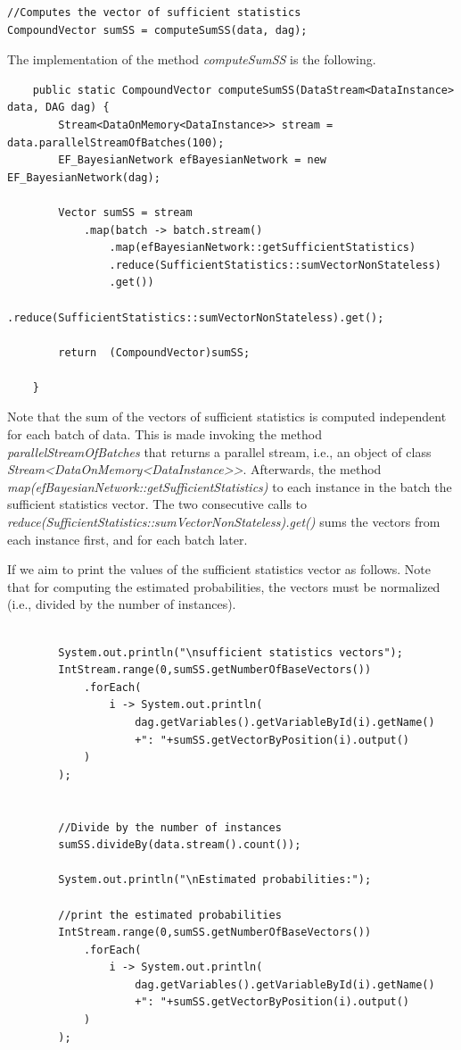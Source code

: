 \documentclass[10pt,a4paper]{article}
\begin{document}
\begin{lstlisting}
//Computes the vector of sufficient statistics
CompoundVector sumSS = computeSumSS(data, dag);
\end{lstlisting}

The implementation of the method \textit{computeSumSS} is the following.

\begin{lstlisting}
	public static CompoundVector computeSumSS(DataStream<DataInstance> data, DAG dag) {
		Stream<DataOnMemory<DataInstance>> stream = data.parallelStreamOfBatches(100);
		EF_BayesianNetwork efBayesianNetwork = new EF_BayesianNetwork(dag);
		
		Vector sumSS = stream
			.map(batch -> batch.stream()
				.map(efBayesianNetwork::getSufficientStatistics)
				.reduce(SufficientStatistics::sumVectorNonStateless)
				.get())
			.reduce(SufficientStatistics::sumVectorNonStateless).get();

		return  (CompoundVector)sumSS;
	
	}
\end{lstlisting}


Note that the sum of the vectors of sufficient statistics is computed independent for each batch of data. This is made invoking the method \textit{parallelStreamOfBatches} that returns a parallel stream, i.e., an object of class \textit{Stream<DataOnMemory<DataInstance>>}. Afterwards, the method \textit{map(efBayesianNetwork::getSufficientStatistics)} to each instance in the batch the sufficient statistics vector. The two consecutive calls to \textit{reduce(SufficientStatistics::sumVectorNonStateless).get()} sums the vectors from each instance first, and for each batch later.\newline


If we aim to print the values of the sufficient statistics vector as follows. Note that for computing the estimated probabilities, the vectors must be normalized (i.e., divided by the number of instances).

\begin{lstlisting}

		System.out.println("\nsufficient statistics vectors");
		IntStream.range(0,sumSS.getNumberOfBaseVectors())
			.forEach(
				i -> System.out.println(
					dag.getVariables().getVariableById(i).getName()
					+": "+sumSS.getVectorByPosition(i).output()
			)
		);
		
		
		//Divide by the number of instances
		sumSS.divideBy(data.stream().count());
		
		System.out.println("\nEstimated probabilities:");
		
		//print the estimated probabilities
		IntStream.range(0,sumSS.getNumberOfBaseVectors())
			.forEach(
				i -> System.out.println(
					dag.getVariables().getVariableById(i).getName()
					+": "+sumSS.getVectorByPosition(i).output()
			)
		);

\end{lstlisting}
\end{document}
